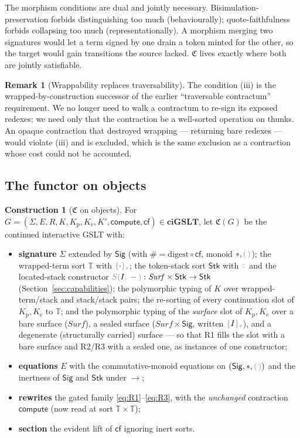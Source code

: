 \documentclass[11pt]{article}
\theoremstyle{definition}
\newtheorem{construction}[definition]{Construction}
\newtheorem{remark}[definition]{Remark}
\theoremstyle{plain}
\newcommand{\ciGSLT}{\mathbf{ciGSLT}}
\newcommand{\dec}[1]{\textcolor{costgray}{#1}}   %
\newcommand{\lstk}[2]{\dec{S(}{#1}\dec{,}\,#2\dec{)}}  %
\newcommand{\Sig}{\mathsf{Sig}}
\newcommand{\Tok}{\mathsf{Stk}}
\newcommand{\WT}{\mathbb{T}}                  %
\newcommand{\Cost}{\mathfrak{C}}              %
\newcommand{\sgn}[2]{\dec{\{}{#1}\dec{\}_{#2}}}  %
\newcommand{\cons}{\mathbin{\dec{\dblcolon}}}  %
\newcommand{\nil}{\dec{(\,)}}                  %
\newcommand{\red}{\longrightarrow}
\newcommand{\hashf}{\#}
\newcommand{\compute}{\mathsf{compute}}
\newcommand{\cf}{\mathsf{cf}}
\newcommand{\Kp}{K_{\mathrm{p}}}
\newcommand{\Ke}{K_{\mathrm{e}}}
\begin{document}
The morphism conditions are dual and jointly necessary.
Bisimulation-preservation forbids distinguishing too much
(behaviourally); quote-faithfulness forbids collapsing too much
(representationally). A morphism merging two signatures would let a term
signed by one drain a token minted for the other, so the target would
gain transitions the source lacked. $\Cost$ lives exactly where both are
jointly satisfiable.

\begin{remark}[Wrappability replaces traversability]
The condition (iii) is the wrapped-by-construction successor of the
earlier ``traversable contractum'' requirement. We no longer need to walk
a contractum to re-sign its exposed redexes; we need only that the
contraction be a well-sorted operation on thunks. An opaque contraction
that destroyed wrapping --- returning bare redexes --- would violate
(iii) and is excluded, which is the same exclusion as a contraction whose
cost could not be accounted.
\end{remark}

\subsection{The functor on objects}

\begin{construction}[$\Cost$ on objects]
\label{con:object}
For $G = (\Sigma,E,R,K,\Kp,\Ke,K',\compute,\cf) \in \ciGSLT$, let
$\Cost(G)$ be the continued interactive GSLT with:
\begin{itemize}[leftmargin=1.6em,itemsep=2pt]
  \item \textbf{signature} $\Sigma$ extended by $\Sig$ (with
    $\hashf=\mathrm{digest}\circ\cf$, monoid $*,\nil$); the wrapped-term
    sort $\WT$ with $\sgn{\cdot}{s}$; the token-stack sort $\Tok$ with
    $\cons$ and the located-stack constructor
    $\lstk{I}{-} : \mathit{Surf}\times\Tok \to \Tok$
    (Section~\ref{sec:capabilities}); the polymorphic typing of $K$ over
    wrapped-term/stack and stack/stack pairs; the re-sorting of every
    continuation slot of $\Kp,\Ke$ to $\WT$; and the polymorphic typing
    of the \emph{surface} slot of $\Kp,\Ke$ over a bare surface
    ($\mathit{Surf}$), a sealed surface ($\mathit{Surf}\times\Sig$,
    written $\sgn{I}{s}$), and a degenerate (structurally carried)
    surface --- so that R1 fills the slot with a bare surface and R2/R3
    with a sealed one, as instances of one constructor;
  \item \textbf{equations} $E$ with the commutative-monoid equations on
    $(\Sig,*,\nil)$ and the inertness of $\Sig$ and $\Tok$ under $\red$;
  \item \textbf{rewrites} the gated family
    \eqref{eq:R1}--\eqref{eq:R3}, with the \emph{unchanged} contraction
    $\compute$ (now read at sort $\WT\times\WT$);
  \item \textbf{section} the evident lift of $\cf$ ignoring inert sorts.
\end{itemize}
\end{construction}
\end{document}
